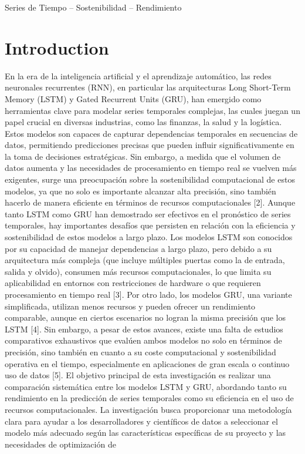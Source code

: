 \documentclass[usenatbib]{tjaa}
\begin{document}
%
\begin{keywords}
Series de Tiempo -- Sostenibilidad -- Rendimiento
\end{keywords}

\section{Introduction}
En la era de la inteligencia artificial y el aprendizaje automático, las redes neuronales recurrentes (RNN), en particular las arquitecturas Long Short-Term Memory (LSTM) y Gated Recurrent Units (GRU), han emergido como herramientas clave para modelar series temporales complejas, las cuales juegan un papel crucial en diversas industrias, como las finanzas, la salud y la logística. Estos modelos son capaces de capturar dependencias temporales en secuencias de datos, permitiendo predicciones precisas que pueden influir significativamente en la toma de decisiones estratégicas. Sin embargo, a medida que el volumen de datos aumenta y las necesidades de procesamiento en tiempo real se vuelven más exigentes, surge una preocupación sobre la sostenibilidad computacional de estos modelos, ya que no solo es importante alcanzar alta precisión, sino también hacerlo de manera eficiente en términos de recursos computacionales [2]. Aunque tanto LSTM como GRU han demostrado ser efectivos en el pronóstico de series temporales, hay importantes desafíos que persisten en relación con la eficiencia y sostenibilidad de estos modelos a largo plazo. Los modelos LSTM son conocidos por su capacidad de manejar dependencias a largo plazo, pero debido a su arquitectura más compleja (que incluye múltiples puertas como la de entrada, salida y olvido), consumen más recursos computacionales, lo que limita su aplicabilidad en entornos con restricciones de hardware o que requieren procesamiento en tiempo real [3]. Por otro lado, los modelos GRU, una variante simplificada, utilizan menos recursos y pueden ofrecer un rendimiento comparable, aunque en ciertos escenarios no logran la misma precisión que los LSTM [4]. Sin embargo, a pesar de estos avances, existe una falta de estudios comparativos exhaustivos que evalúen ambos modelos no solo en términos de precisión, sino también en cuanto a su coste computacional y sostenibilidad operativa en el tiempo, especialmente en aplicaciones de gran escala o continuo uso de datos [5]. El objetivo principal de esta investigación es realizar una comparación sistemática entre los modelos LSTM y GRU, abordando tanto su rendimiento en la predicción de series temporales como su eficiencia en el uso de recursos computacionales. La investigación busca proporcionar una metodología clara para ayudar a los desarrolladores y científicos de datos a seleccionar el modelo más adecuado según las características específicas de su proyecto y las necesidades de optimización de 
\end{document}
